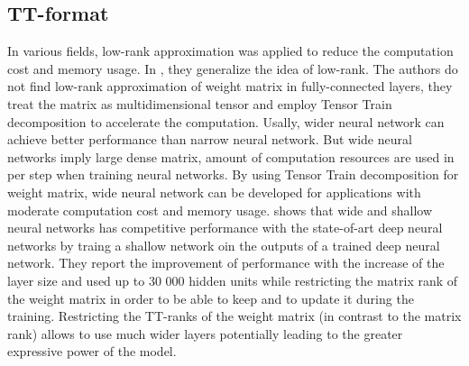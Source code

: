 \documentclass[onecolumn, conference]{IEEEtran}
\begin{document}
\subsection{TT-format}

In various fields, low-rank approximation was applied to reduce the computation cost and memory usage. In \cite{b11}, they generalize the idea of low-rank. The authors do not find low-rank approximation of weight matrix in fully-connected layers, they treat the matrix as multidimensional tensor and employ Tensor Train decomposition \cite{b6} to accelerate the computation.
Usally, wider neural network can achieve better performance than narrow neural network. But wide neural networks imply large dense matrix, amount of computation resources are used in per step when training neural networks. By using Tensor Train decomposition for weight matrix, wide neural network can be developed for applications with moderate computation cost and memory usage. 
\cite{gilboa2013scaling} shows that wide and shallow neural networks has competitive performance with the state-of-art deep neural networks by traing a shallow network oin the outputs of a trained deep neural network.
They report the improvement of performance with the increase of the layer size and used up to 30 000 hidden units while restricting the matrix rank of the weight matrix in order to be able to keep and to update it during the training. Restricting the TT-ranks of the weight matrix (in contrast to the matrix rank) allows to use much wider layers potentially leading to the greater expressive power of the model.
\end{document}
